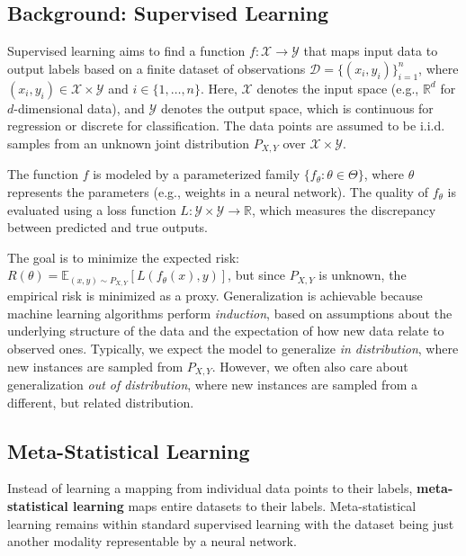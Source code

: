 \subsection{Background: Supervised Learning}
Supervised learning aims to find a function \( f: \mathcal{X} \to \mathcal{Y} \) that maps input data to output labels based on a finite dataset of observations \( \mathcal{D} = \{(x_i, y_i)\}_{i=1}^n \), where \( (x_i, y_i) \in \mathcal{X} \times \mathcal{Y} \) and \( i \in \{1, \dots, n\} \). Here, \( \mathcal{X} \) denotes the input space (e.g., \( \mathbb{R}^d \) for \( d \)-dimensional data), and \( \mathcal{Y} \) denotes the output space, which is continuous for regression or discrete for classification. The data points are assumed to be i.i.d. samples from an unknown joint distribution \( P_{X,Y} \) over \( \mathcal{X} \times \mathcal{Y} \).

The function \( f \) is modeled by a parameterized family \( \{f_\theta : \theta \in \Theta\} \), where \( \theta \) represents the parameters (e.g., weights in a neural network). The quality of \( f_\theta \) is evaluated using a loss function \( L: \mathcal{Y} \times \mathcal{Y} \to \mathbb{R} \), which measures the discrepancy between predicted and true outputs. 

The goal is to minimize the expected risk: \(R(\theta) = \mathbb{E}_{(x, y) \sim P_{X,Y}}[L(f_\theta(x), y)]\), but since \( P_{X,Y} \) is unknown, the empirical risk is minimized as a proxy. 
Generalization is achievable because machine learning algorithms perform \emph{induction}, based on assumptions about the underlying structure of the data and the expectation of how new data relate to observed ones. Typically, we expect the model to generalize \textit{in distribution}, where new instances are sampled from \( P_{X,Y} \). However, we often also care about generalization \textit{out of distribution}, where new instances are sampled from a different, but related distribution.

\subsection{Meta-Statistical Learning}
Instead of learning a mapping from individual data points to their labels, \textbf{meta-statistical learning} maps entire datasets to their labels. 
Meta-statistical learning remains within standard supervised learning with the dataset being just another modality representable by a neural network. 

